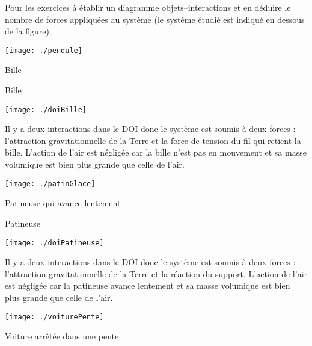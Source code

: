 


Pour les exercices  à  établir un diagramme objets--interactions et en déduire le nombre de forces appliquées au système (le système étudié est indiqué en dessous de la figure).

\begin{exercice}
\label{doiFirst}
\begin{center}
    \texttt{[image: ./pendule]}  
    
    Bille
\end{center}
\end{exercice}

\begin{corrige}
Bille

\begin{center}
    \texttt{[image: ./doiBille]}  
\end{center}
Il y a deux interactions dans le DOI donc le système est soumis à deux forces : l'attraction gravitationnelle de la Terre et la force de tension du fil qui retient la bille. L'action de l'air est négligée car la bille n'est pas en mouvement et sa masse volumique est bien plus grande que celle de l'air.
\end{corrige}

\begin{exercice}
\begin{center}
    \texttt{[image: ./patinGlace]}   
    
    Patineuse qui avance lentement
\end{center}
\end{exercice}

\begin{corrige}
Patineuse

\begin{center}
    \texttt{[image: ./doiPatineuse]}  
\end{center}
Il y a deux interactions dans le DOI donc le système est soumis à deux forces : l'attraction gravitationnelle de la Terre et la réaction du support. L'action de l'air est négligée car la patineuse avance lentement et sa masse volumique est bien plus grande que celle de l'air.
\end{corrige}

\begin{exercice}
\begin{center}
    \texttt{[image: ./voiturePente]} 
    
    Voiture arrêtée dans une pente
\end{center}
\end{exercice}

